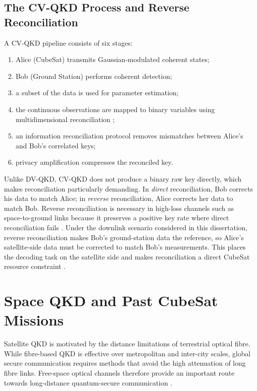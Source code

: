 \documentclass{UoYCSproject}
\begin{document}
\subsection{The CV-QKD Process and Reverse Reconciliation}
\label{subsec:bg-cvqkd-process}

A CV-QKD pipeline consists of six stages: 
\begin{enumerate}
    \item Alice (CubeSat) transmits Gaussian-modulated coherent states;
    \item Bob (Ground Station) performs coherent detection;
    \item a subset of the data is used for parameter estimation;
    \item the continuous observations are mapped to binary variables using multidimensional reconciliation \cite{leverrier_multidimensional_2008};
    \item an information reconciliation protocol removes mismatches between Alice's and Bob's correlated keys; 
    \item privacy amplification compresses the reconciled key.
\end{enumerate}
Unlike DV-QKD, CV-QKD does not produce a binary raw key directly, which makes
reconciliation particularly demanding. In \emph{direct} reconciliation, Bob
corrects his data to match Alice; in \emph{reverse} reconciliation, Alice
corrects her data to match Bob. Reverse reconciliation is necessary in
high-loss channels such as space-to-ground links because it preserves a
positive key rate where direct reconciliation fails
\cite{grosshans_continuous_2002, grosshans_quantum_2003}. Under the downlink
scenario considered in this dissertation, reverse reconciliation makes Bob's
ground-station data the reference, so Alice's satellite-side data must be
corrected to match Bob's measurements. This places the decoding task on the
satellite side and makes reconciliation a direct CubeSat resource constraint
\cite{mueller_performance_2025}.

\section{Space QKD and Past CubeSat Missions}
\label{sec:lit-space}

Satellite QKD is motivated by the distance limitations of terrestrial optical
fibre. While fibre-based QKD is effective over metropolitan and inter-city
scales, global secure communication requires methods that avoid the high
attenuation of long fibre links. Free-space optical channels therefore provide
an important route towards long-distance quantum-secure communication
\cite{lauterbach_study_2023}.
\end{document}
